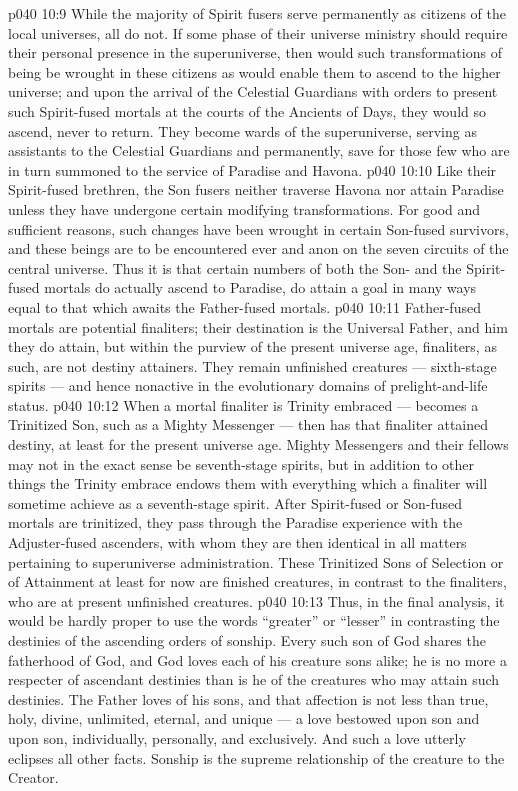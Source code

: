 \vs p040 10:9 \pc While the majority of Spirit fusers serve permanently as citizens of the local universes, all do not. If some phase of their universe ministry should require their personal presence in the superuniverse, then would such transformations of being be wrought in these citizens as would enable them to ascend to the higher universe; and upon the arrival of the Celestial Guardians with orders to present such Spirit\hyp{}fused mortals at the courts of the Ancients of Days, they would so ascend, never to return. They become wards of the superuniverse, serving as assistants to the Celestial Guardians and permanently, save for those few who are in turn summoned to the service of Paradise and Havona.
\vs p040 10:10 Like their Spirit\hyp{}fused brethren, the Son fusers neither traverse Havona nor attain Paradise unless they have undergone certain modifying transformations. For good and sufficient reasons, such changes have been wrought in certain Son\hyp{}fused survivors, and these beings are to be encountered ever and anon on the seven circuits of the central universe. Thus it is that certain numbers of both the Son\hyp{} and the Spirit\hyp{}fused mortals do actually ascend to Paradise, do attain a goal in many ways equal to that which awaits the Father\hyp{}fused mortals.
\vs p040 10:11 Father\hyp{}fused mortals are potential finaliters; their destination is the Universal Father, and him they do attain, but within the purview of the present universe age, finaliters, as such, are not destiny attainers. They remain unfinished creatures --- sixth\hyp{}stage spirits --- and hence nonactive in the evolutionary domains of prelight\hyp{}and\hyp{}life status.
\vs p040 10:12 When a mortal finaliter is Trinity embraced --- becomes a Trinitized Son, such as a Mighty Messenger --- then has that finaliter attained destiny, at least for the present universe age. Mighty Messengers and their fellows may not in the exact sense be seventh\hyp{}stage spirits, but in addition to other things the Trinity embrace endows them with everything which a finaliter will sometime achieve as a seventh\hyp{}stage spirit. After Spirit\hyp{}fused or Son\hyp{}fused mortals are trinitized, they pass through the Paradise experience with the Adjuster\hyp{}fused ascenders, with whom they are then identical in all matters pertaining to superuniverse administration. These Trinitized Sons of Selection or of Attainment at least for now are finished creatures, in contrast to the finaliters, who are at present unfinished creatures.
\vs p040 10:13 \pc Thus, in the final analysis, it would be hardly proper to use the words “greater” or “lesser” in contrasting the destinies of the ascending orders of sonship. Every such son of God shares the fatherhood of God, and God loves each of his creature sons alike; he is no more a respecter of ascendant destinies than is he of the creatures who may attain such destinies. The Father loves  of his sons, and that affection is not less than true, holy, divine, unlimited, eternal, and unique --- a love bestowed upon  son and upon  son, individually, personally, and exclusively. And such a love utterly eclipses all other facts. Sonship is the supreme relationship of the creature to the Creator.
